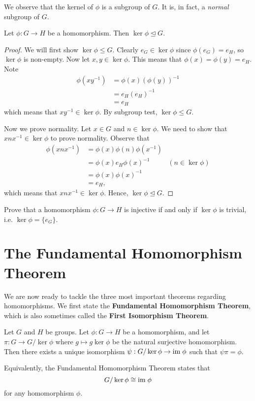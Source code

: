 We observe that the kernel of $\phi$ is a subgroup of $G$. It is, in fact, a \textit{normal} subgroup of $G$.
\begin{proposition}\label{prop-kernel-is-normal-subgroup-of-domain}
    Let $\phi: G \to H$ be a homomorphism. Then $\ker\phi \unlhd G$.
\end{proposition}
\begin{proof}
    We will first show $\ker\phi\leq G$. Clearly $e_G \in \ker\phi$ since $\phi(e_G) = e_H$, so $\ker\phi$ is non-empty. Now let $x, y \in \ker\phi$. This means that $\phi(x) = \phi(y) = e_H$. Note
    \begin{align*}
        \phi(xy^{-1}) &= \phi(x)\left(\phi(y)\right)^{-1}\\
        &= e_H(e_H)^{-1}\\
        &= e_H
    \end{align*}
    which means that $xy^{-1}\in\ker\phi$. By subgroup test, $\ker\phi\leq G$.

    Now we prove normality. Let $x \in G$ and $n \in \ker\phi$. We need to show that $xnx^{-1}\in\ker\phi$ to prove normality. Observe that
    \begin{align*}
        \phi(xnx^{-1}) &= \phi(x)\phi(n)\phi(x^{-1})\\
        &= \phi(x)e_H\phi(x)^{-1} & (n \in \ker\phi)\\
        &= \phi(x)\phi(x)^{-1}\\
        &= e_H,
    \end{align*}
    which means that $xnx^{-1} \in \ker\phi$. Hence, $\ker\phi \unlhd G$.
\end{proof}

\begin{exercise}\label{exercise-trivial-kernel-means-injective}
    Prove that a homomorphism $\phi:G\to H$ is injective if and only if $\ker \phi$ is trivial, i.e. $\ker \phi = \{e_G\}$.
\end{exercise}

\section{The Fundamental Homomorphism Theorem}
We are now ready to tackle the three most important theorems regarding homomorphisms. We first state the \textbf{Fundamental Homomorphism Theorem}, which is also sometimes called the \textbf{First Isomorphism Theorem}.
\begin{theorem}\label{thrm-isomorphism-1}
    Let $G$ and $H$ be groups. Let $\phi: G \to H$ be a homomorphism, and let $\pi: G \to G/\ker\phi$ where $g\mapsto g\ker\phi$ be the natural surjective homomorphism. Then there exists a unique isomorphism $\psi: G/\ker\phi \to \mathrm{im}\;\phi$ such that $\psi\pi = \phi$.
\end{theorem}
Equivalently, the Fundamental Homomorphism Theorem states that
\[
    G/\ker\phi \cong \mathrm{im}\;\phi
\]
for any homomorphism $\phi$.

